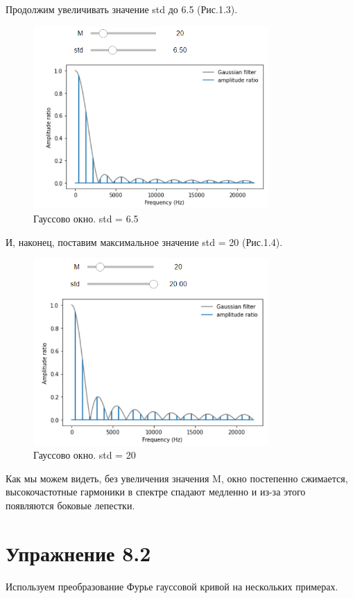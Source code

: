 \documentclass[a4paper,12pt]{report}
\begin{document}
    Продолжим увеличивать значение std до 6.5 (Рис.1.3).
\begin{figure}[H]
        \centering
        \includegraphics[width=0.8\textwidth]{fig1-3.PNG}
        \caption{Гауссово окно. std = 6.5}
        \label{fig:fig1-3}
\end{figure}  
    
    И, наконец, поставим максимальное значение std = 20 (Рис.1.4).
\begin{figure}[H]
        \centering
        \includegraphics[width=0.8\textwidth]{fig1-4.PNG}
        \caption{Гауссово окно. std = 20}
        \label{fig:fig1-4}
\end{figure}

    Как мы можем видеть, без увеличения значения M, окно постепенно сжимается, высокочастотные гармоники в спектре спадают медленно и из-за этого появляются боковые лепестки. 
    
\chapter{Упражнение 8.2}
    Используем преобразование Фурье гауссовой кривой на нескольких примерах.
    
\end{document}
